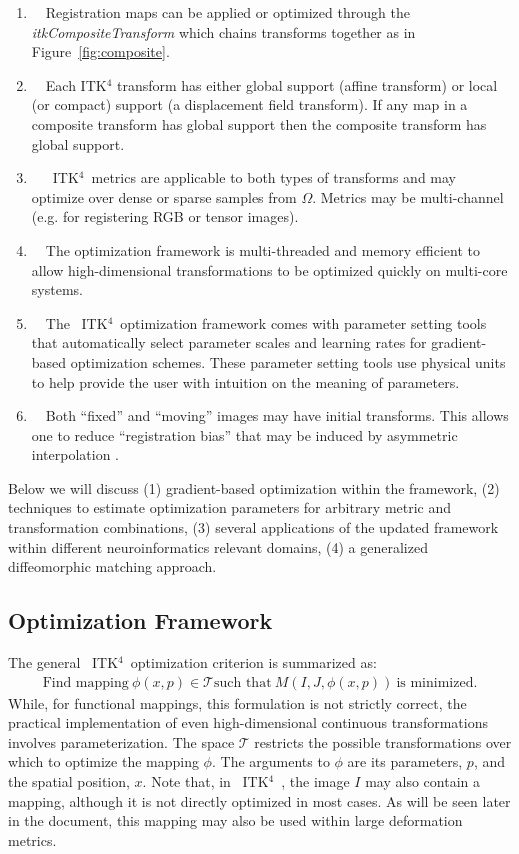 \documentclass{frontiersSCNS}
\newcommand{\tk}{~ITK$^{\text{4}}$~}
\begin{document}
\begin{enumerate}
\item~~Registration maps can be applied or optimized through the {\em
    itkCompositeTransform} which chains transforms together as in Figure~\ref{fig:composite}.
\item~~Each ITK$^4$ transform has either global support (affine
  transform) or local (or compact) support (a displacement field transform).   If
  any map in a composite transform has global support then the
  composite transform has global support. 
\item~~\tk metrics are applicable to both types of transforms and may
  optimize over dense or sparse samples from $\Omega$.  Metrics may be
  multi-channel (e.g. for registering RGB or tensor images).
\item~~The optimization framework is multi-threaded and memory
  efficient to allow high-dimensional transformations to be optimized
  quickly on multi-core systems.
\item~~The \tk optimization framework comes with parameter setting tools
  that automatically select parameter scales and learning rates for
  gradient-based optimization schemes.  These parameter setting tools
  use physical units to help provide the user with intuition on the
  meaning of parameters.  
\item~~Both ``fixed'' and ``moving'' images may have initial
  transforms.  This allows one to reduce ``registration bias'' that
  may be induced by asymmetric interpolation \cite{Yushkevich2010a}. 
\end{enumerate}
Below we will discuss (1) gradient-based optimization within the
framework, (2) techniques to estimate optimization parameters for
arbitrary metric and transformation combinations, (3) several
applications of the updated framework within different
neuroinformatics relevant domains, (4) a generalized diffeomorphic
matching approach.

\subsection{Optimization Framework}
The general \tk optimization criterion is summarized as:
\begin{eqnarray}
\text{Find mapping}~\phi(x,p) \in \mathcal{T}
\text{such that}~M(I,J,\phi(x,p))~\text{is minimized}. 
\label{eq:gen}
\end{eqnarray}
While, for functional mappings, this formulation is not strictly correct, the
practical implementation of even high-dimensional continuous
transformations involves parameterization. 
The space $\mathcal{T}$ restricts the possible transformations over
which to optimize the mapping $\phi$.  The arguments to $\phi$ are its
parameters, $p$, and the spatial position, $x$.  Note that, in \tk,
the image $I$ may also contain a mapping, although it is not directly
optimized in most cases.  As will be seen later in the document, this
mapping may also be used within large deformation metrics. 
\end{document}
